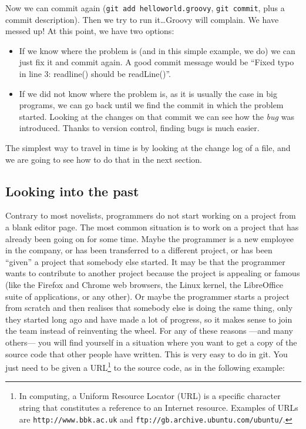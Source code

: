 Now we can commit again (\verb+git add helloworld.groovy+,
\verb+git commit+, plus a commit description). Then we try to run
it\ldots Groovy will complain. We have messed up! At this point, we
have two options:

\begin{itemize}
\item If we know where the problem is (and in this simple example, we
  do) we can just fix it and commit again. A good commit message would
  be ``Fixed typo in line 3: readline() should be readLine()''.
\item If we did not know where the problem is, as it is usually the
  case in big programs, we can go back until we find the commit in
  which the problem started. Looking at the changes on that commit we
  can see how the \emph{bug} was introduced. Thanks to version
  control, finding bugs is much easier. 
\end{itemize}

The simplest way to travel in time is by looking at the change log of
a file, and we are going to see how to do that in the next section. 


\subsection{Looking into the past}
\label{sec:looking-into-past}

Contrary to most novelists, programmers do not start working on a
project from a blank editor page. The most common situation is to work
on a project that has already been going on for some time. Maybe the
programmer is a new employee in the company, or has been transferred
to a different project, or has been ``given'' a project that somebody
else started. It may be that the programmer wants to contribute to
another project because the project is appealing or famous (like the
Firefox and Chrome web browsers, the Linux kernel, the LibreOffice
suite of applications, or any other). Or maybe the programmer starts a
project from scratch and then realises that somebody else is doing the
same thing, only they started long ago and have made a lot of
progress, so it makes sense to join the team instead of reinventing
the wheel. For any of these reasons ---and many others--- you will
find yourself in a situation where you want to get a copy of the
source code that other people have written. This is very easy to do in
git. You just need to be given a URL\footnote{In computing, a Uniform
  Resource Locator (URL) is a specific character string that
  constitutes a reference to an Internet resource. Examples of URLs
  are \verb+http://www.bbk.ac.uk+ and
  \verb+ftp://gb.archive.ubuntu.com/ubuntu/+.} to the source code, as
in the following example:

